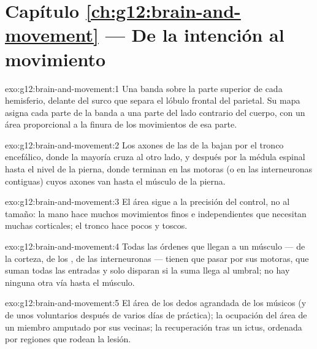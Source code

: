 \section*{Capítulo \ref{ch:g12:brain-and-movement} --- De la intención al movimiento}

\begin{solution}{exo:g12:brain-and-movement:1}
Una banda sobre la parte superior de cada hemisferio, delante del surco
que separa el lóbulo frontal del parietal. Su mapa asigna cada parte de
la banda a una parte del lado contrario del cuerpo, con un área
proporcional a la finura de los movimientos de esa parte.
\end{solution}

\begin{solution}{exo:g12:brain-and-movement:2}
Los axones de las  de la  bajan por el tronco
encefálico, donde la mayoría cruza al otro lado, y después por la
médula espinal hasta el nivel de la pierna, donde terminan en las
 motoras (o en las interneuronas contiguas) cuyos axones van
hasta el músculo de la pierna.
\end{solution}

\begin{solution}{exo:g12:brain-and-movement:3}
El área sigue a la precisión del control, no al tamaño: la mano hace
muchos movimientos finos e independientes que necesitan muchas 
corticales; el tronco hace pocos y toscos.
\end{solution}

\begin{solution}{exo:g12:brain-and-movement:4}
Todas las órdenes que llegan a un músculo --- de la corteza, de los
, de las interneuronas --- tienen que pasar por sus
 motoras, que suman todas las entradas y solo disparan si la
suma llega al umbral; no hay ninguna otra vía hasta el músculo.
\end{solution}

\begin{solution}{exo:g12:brain-and-movement:5}
El área de los dedos agrandada de los músicos (y de unos voluntarios
después de varios días de práctica); la ocupación del área de un
miembro amputado por sus vecinas; la recuperación tras un ictus,
ordenada por regiones que rodean la lesión.
\end{solution}

